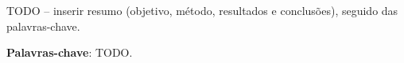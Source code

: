 \documentclass[
  12pt,
  oneside,
  a4paper
]{abntex2}
\begin{document}
\frenchspacing

\pretextual

\imprimircapa
\imprimirfolhaderosto

\begin{resumo}
TODO -- inserir resumo (objetivo, método, resultados e conclusões), seguido
das palavras-chave.

\textbf{Palavras-chave}: TODO.
\end{resumo}

\listoffigures*
\cleardoublepage

\listoftables*
\cleardoublepage

\tableofcontents*
\cleardoublepage

\textual










\postextual


\end{document}
